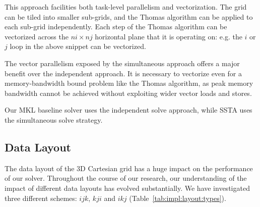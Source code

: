 \documentclass[10pt, conference, compsocconf]{IEEEtran}
\begin{document}
This approach facilities both task-level parallelism and vectorization.
The grid can be tiled into smaller sub-grids, and the Thomas
  algorithm can be applied to each sub-grid independently.
Each step of the Thomas algorithm can be vectorized across the \(ni \times nj\)
  horizontal plane that it is operating on: e.g. the \(i\) or \(j\) loop in the
  above snippet can be vectorized.

The vector parallelism exposed by the simultaneous approach offers a major
  benefit over the independent approach.
It is necessary to vectorize even for a memory-bandwidth bound problem like the
  Thomas algorithm, as peak memory bandwidth cannot be achieved without
  exploiting wider vector loads and stores.

Our MKL baseline solver uses the independent solve approach, while SSTA uses
  the simultaneous solve strategy.

\subsection{Data Layout}
\label{sec:impl:data_layout}

The data layout of the 3D Cartesian grid has a huge impact on the performance
  of our solver.
Throughout the course of our research, our understanding of the impact of
  different data layouts has evolved substantially.
We have investigated three different schemes: \(ijk\), \(kji\) and \(ikj\)
  (Table~\ref{tab:impl:layout:types}).
\end{document}
